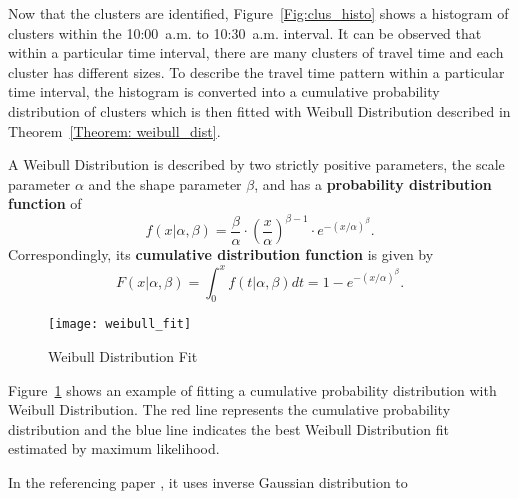 Now that the clusters are identified, Figure~\ref{Fig:clus_histo} shows a histogram of clusters within the 10:00~a.m. to 10:30~a.m. interval. It can be observed that within a particular time interval, there are many clusters of travel time and each cluster has different sizes. To describe the travel time pattern within a particular time interval, the histogram is converted into a cumulative probability distribution of clusters which is then fitted with Weibull Distribution described in Theorem~\ref{Theorem: weibull_dist}. 

\begin{theorem}\label{Theorem: weibull_dist}
A Weibull Distribution is described by two strictly positive parameters, the scale parameter $\alpha$ and the shape parameter $\beta$, and has a \textbf{probability distribution function} of \cite{WEDI}
\begin{equation}
f(x | \alpha, \beta) = \frac{\beta}{\alpha}\cdot(\frac{x}{\alpha})^{\beta - 1}\cdot e^{-(x / \alpha)^{\beta}}.
\end{equation}
Correspondingly, its \textbf{cumulative distribution function} is given by \cite{WEIB}
\begin{equation}
F(x | \alpha, \beta) = \int_{0}^{x} f(t | \alpha, \beta) dt = 1 - e^{-(x / \alpha)^{\beta}}.
\end{equation}
\end{theorem}

\begin{figure}[h!]
\texttt{[image: weibull\_fit]}
\centering
\caption{Weibull Distribution Fit}\label{Fig:weibull_fit}
\end{figure}

Figure~\ref{Fig:weibull_fit} shows an example of fitting a cumulative probability distribution with Weibull Distribution. The red line represents the cumulative probability distribution and the blue line indicates the best Weibull Distribution fit estimated by maximum likelihood. 

In the referencing paper \cite{TDR10}, it uses inverse Gaussian distribution to 
